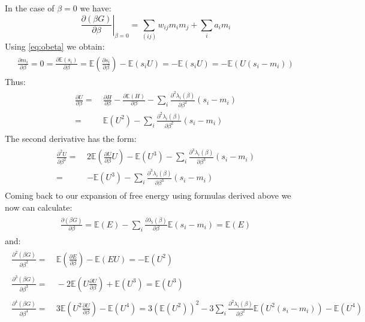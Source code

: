 \documentclass[12pt,a4paper]{article}
\begin{document}
In the case of $\beta = 0$ we have:
$$ \left. \frac{\partial (\beta G)}{\partial \beta}\right|_{\beta = 0} = \sum_{(ij)} w_{ij} m_i m_j +  \sum_i a_i m_i $$
Using \ref{eq:obeta} we obtain:
\begin{align}
\begin{split}
\frac{\partial m_i}{\partial \beta} = 0 = \frac{\partial \mathbb{E}(s_i)}{\partial \beta}  =   \mathbb{E} \left(\frac{\partial s_i}{\partial \beta} \right) - \mathbb{E}(s_iU) =- \mathbb{E}(s_iU)  =- \mathbb{E}(U(s_i - m_i)) 
\end{split}
\end{align}
Thus:
\begin{align}
\begin{split}
\frac{\partial U}{\partial \beta}  =  ~&\frac{\partial H}{\partial \beta} - \frac{\partial \mathbb{E}(H)}{\partial \beta} - \sum_i \frac{\partial^2 \lambda_i (\beta)}{\partial \beta^2} (s_i - m_i)\\
= ~& \mathbb{E}(U^2) - \sum_i \frac{\partial^2 \lambda_i (\beta)}{\partial \beta^2} (s_i - m_i)
\end{split}
\end{align}
The second derivative has the form:
\begin{align}
\begin{split}
\frac{\partial^2 U}{\partial \beta^2}  =  ~& 2 \mathbb{E}\left(\frac{\partial U}{\partial \beta}U  \right) - \mathbb{E}(U^3) - \sum_i \frac{\partial^3 \lambda_i (\beta)}{\partial \beta^3} (s_i - m_i) \\
= ~& - \mathbb{E}(U^3) - \sum_i \frac{\partial^3 \lambda_i (\beta)}{\partial \beta^3} (s_i - m_i)
\end{split}
\end{align}
Coming back to our expansion of free energy using formulas derived above we now can calculate:
\begin{align}
\begin{split}
 \frac{\partial (\beta G)}{\partial \beta} = \mathbb{E}(E) - \sum_i \frac{\partial\lambda_i (\beta)}{\partial \beta}\mathbb{E}(s_i - m_i) = \mathbb{E}(E) 
\end{split}
\end{align}
and:
\begin{align}
\begin{split}
 \frac{\partial^2 (\beta G)}{\partial \beta^2} = &~ \mathbb{E}\left( \frac{\partial E}{\partial \beta} \right) - \mathbb{E}(EU) = - \mathbb{E}(U^2)\\
\\
 \frac{\partial^3 (\beta G)}{\partial \beta^3}= &~ - 2\mathbb{E}\left( U \frac{\partial U}{\partial \beta} \right) + \mathbb{E}(U^3)  = \mathbb{E}(U^3)  \\
 \\
  \frac{\partial^4 (\beta G)}{\partial \beta^4}= &~ 3\mathbb{E}\left( U^2 \frac{\partial U}{\partial \beta} \right) - \mathbb{E}(U^4)  = 3\left(\mathbb{E}(U^2)\right)^2 -3\sum_i \frac{\partial^2 \lambda_i (\beta)}{\partial \beta^2}\mathbb{E}(U^2(s_i-m_i))- \mathbb{E}(U^4) 
  \label{eq:higherOrders}
\end{split}
\end{align}
\end{document}
